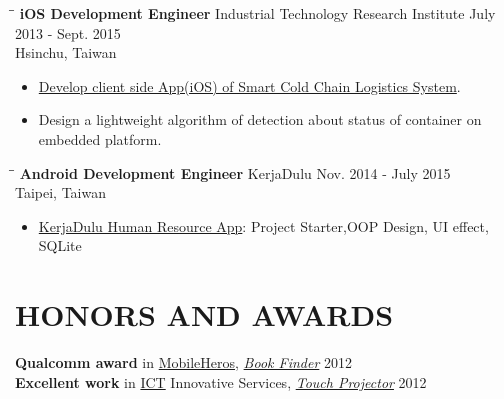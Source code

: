 \documentclass{res}
\begin{document}
\begin{resume}
\begin{itemize}
				\end{itemize}
				\begin{tabbing}
	 				\hspace{2.3in}\= \hspace{2.6in}\= \kill %
					{\bf iOS Development Engineer} \>Industrial Technology Research Institute	
					\>July 2013 - Sept. 2015\\
													\>Hsinchu, Taiwan
	 			\end{tabbing}
	 			\vspace{-20pt}
	 			\vspace{0.2in}	
				\begin{itemize}
					\item \href{http://www.ece.uci.edu/~chou/pdf/chou-ithings14container2.pdf}{Develop client side App(iOS) of Smart Cold Chain Logistics System}.
					\vspace{-0.05in}	
					\item Design a lightweight algorithm of detection about status of container on embedded platform.
				\end{itemize}
				\begin{tabbing}%
					\hspace{2.3in}\= \hspace{2.6in}\= \kill %
	 				{\bf Android Development Engineer }  \>KerjaDulu\> Nov. 2014 - July 2015\\
													\>Taipei, Taiwan
				\end{tabbing}
				\vspace{-20pt}
				\vspace{0.2in}	
				\begin{itemize}
					\item {\href{https://play.google.com/store/apps/details?id=com.kerjadulu.kerjadulu&hl=zh_TW}{KerjaDulu Human Resource App}}: Project Starter,OOP Design, UI effect, SQLite
				\end{itemize}

			

			

			\section{HONORS AND AWARDS}          
				{\bf Q​ualcomm award} in \href{https://www.mobilehero.com/component/k2/item/209-a2012_11-10.html?Itemid=196}{MobileHeros}, \href{https://www.youtube.com/watch?v=BvLKtrgq_yw}{\sl B​ook Finder} \hfill 2012\\
				{\bf Excellent work} in \href{http://innoserve.tca.org.tw/en/index.aspx}{ICT} Innovative Services, \href{https://www.youtube.com/watch?v=nt4eUAXqXyk}{\sl T​ouch Projector​} \hfill 2012\\  


\end{resume}
\end{document}
